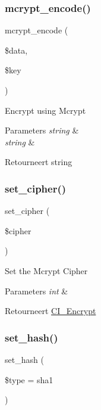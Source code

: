 \subsubsection{\texorpdfstring{mcrypt\_encode()}{mcrypt\_encode()}}
{\footnotesize\ttfamily mcrypt\+\_\+encode (\begin{DoxyParamCaption}\item[{}]{\$data,  }\item[{}]{\$key }\end{DoxyParamCaption})}

Encrypt using Mcrypt


\begin{DoxyParams}{Parameters}
{\em string} & \\
\hline
{\em string} & \\
\hline
\end{DoxyParams}
\begin{DoxyReturn}{Retourneert}
string 
\end{DoxyReturn}
\mbox{\label{class_c_i___encrypt_a6459059d757a362410feb13d96455747}} 
\subsubsection{\texorpdfstring{set\_cipher()}{set\_cipher()}}
{\footnotesize\ttfamily set\+\_\+cipher (\begin{DoxyParamCaption}\item[{}]{\$cipher }\end{DoxyParamCaption})}

Set the Mcrypt Cipher


\begin{DoxyParams}{Parameters}
{\em int} & \\
\hline
\end{DoxyParams}
\begin{DoxyReturn}{Retourneert}
\mbox{\hyperlink{class_c_i___encrypt}{C\+I\+\_\+\+Encrypt}} 
\end{DoxyReturn}
\mbox{\label{class_c_i___encrypt_aa7cef093f6581d1dbeecdf815c7fd8b2}} 
\subsubsection{\texorpdfstring{set\_hash()}{set\_hash()}}
{\footnotesize\ttfamily set\+\_\+hash (\begin{DoxyParamCaption}\item[{}]{\$type = {\ttfamily \textquotesingle{}sha1\textquotesingle{}} }\end{DoxyParamCaption})}

